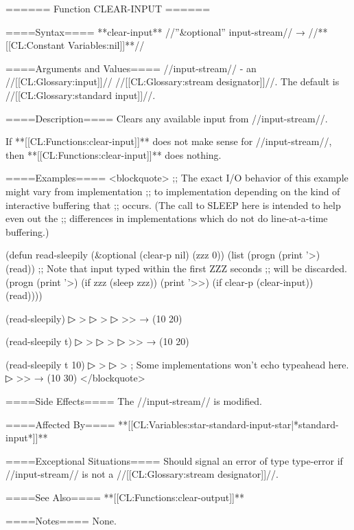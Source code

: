 ====== Function CLEAR-INPUT ======

====Syntax====
**{clear-input}** //''&optional'' input-stream// → //**[[CL:Constant Variables:nil]]**//

====Arguments and Values====
//input-stream// - an //[[CL:Glossary:input]]// //[[CL:Glossary:stream designator]]//. The default is //[[CL:Glossary:standard input]]//.

====Description====
Clears any available input from //input-stream//.

If **[[CL:Functions:clear-input]]** does not make sense for //input-stream//, then **[[CL:Functions:clear-input]]** does nothing.

====Examples==== <blockquote> ;; The exact I/O behavior of this example might vary from implementation ;; to implementation depending on the kind of interactive buffering that ;; occurs. (The call to SLEEP here is intended to help even out the ;; differences in implementations which do not do line-at-a-time buffering.)

(defun read-sleepily (&optional (clear-p nil) (zzz 0)) (list (progn (print '>) (read)) ;; Note that input typed within the first ZZZ seconds ;; will be discarded. (progn (print '>) (if zzz (sleep zzz)) (print '>>) (if clear-p (clear-input)) (read))))

(read-sleepily)
▷ > 
▷ >
▷ >>  → (10 20)

(read-sleepily t)
▷ > 
▷ >
▷ >>  → (10 20)

(read-sleepily t 10)
▷ > 
▷ >  ; Some implementations won't echo typeahead here.
▷ >>  → (10 30) </blockquote>

====Side Effects====
The //input-stream// is modified.

====Affected By====
**[[CL:Variables:star-standard-input-star|*standard-input*]]**

====Exceptional Situations====
Should signal an error of type type-error if //input-stream// is not a //[[CL:Glossary:stream designator]]//.

====See Also====
**[[CL:Functions:clear-output]]**

====Notes====
None.

